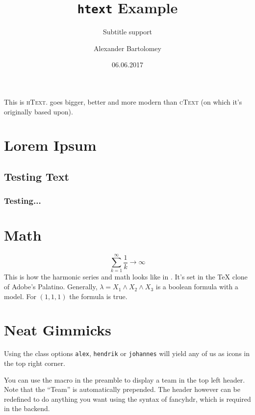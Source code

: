 \documentclass[alex,hendrik,johannes]{htext}
\title{\texttt{htext} Example}
\subtitle{Subtitle support}
\author{Alexander Bartolomey}
\date{06.06.2017}
\begin{document}
\maketitle
This is \textsc{hText}. \hText goes bigger, better and more modern than
\textsc{cText} (on which it's originally based upon).
\section{Lorem Ipsum}
\subsection{Testing Text}
\subsubsection{Testing...}
\lipsum[1-3]
\section{Math}
\[
  \sum\limits_{k=1}^{\infty} \frac{1}{k} \rightarrow \infty
\]
This is how the harmonic series and math looks like in \hText. It's set in the
TeX clone of Adobe's Palatino. Generally, \(\lambda = X_1 \wedge X_2 \wedge X_3
\) is a boolean formula with a model. For \((1,1,1)\) the formula is true.
\section{Neat Gimmicks}
Using the class options \texttt{alex}, \texttt{hendrik} or \texttt{johannes}
will yield any of us as icons in the top right corner.

You can use the macro \texttt{\team} in the preamble to display a team in the
top left header. Note that the ``Team'' is automatically prepended. The header
however can be redefined to do anything you want using the syntax of fancyhdr,
which is required in the backend.
\end{document}
